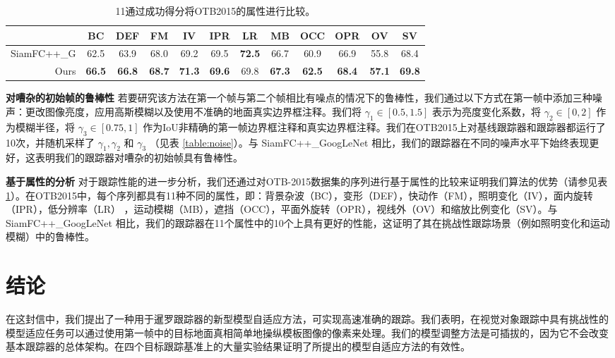 \begin{table}[t]
\renewcommand\arraystretch{0.8}
\centering
\setlength{\tabcolsep}{2pt}
\caption{11通过成功得分将OTB2015的属性进行比较。}
\begin{tabular}{r c c c c c c c c c c c}
\toprule
            & BC & DEF & FM            & IV            & IPR           & LR    & MB    & OCC   & OPR   & OV    & SV    \\
\midrule
SiamFC++\_G  &  62.5 & 63.9 & 68.0          & 69.2          & 69.5          & \textbf{72.5}  & 66.7 & 60.9 & 66.9 & 55.8 & 68.4 \\
Ours        & \textbf{66.5} & \textbf{66.8} & \textbf{68.7} & \textbf{71.3} & \textbf{69.6} & 69.8  & \textbf{67.3} & \textbf{62.5} & \textbf{68.4} & \textbf{57.1} & \textbf{69.8} \\
\bottomrule
\end{tabular}
\label{table:attr}
\end{table}

\textbf{对嘈杂的初始帧的鲁棒性} 若要研究该方法在第一个帧与第二个帧相比有噪点的情况下的鲁棒性，我们通过以下方式在第一帧中添加三种噪声：更改图像亮度，应用高斯模糊以及使用不准确的地面真实边界框注释。我们将 $\gamma_1 \in [0.5, 1.5]$ 表示为亮度变化系数，将 $\gamma_2 \in [0, 2]$ 作为模糊半径，将 $\gamma_3 \in [0.75, 1]$ 作为IoU非精确的第一帧边界框注释和真实边界框注释。我们在OTB2015上对基线跟踪器和跟踪器都运行了10次，并随机采样了 $\gamma_1, \gamma_2$ 和 $\gamma_3$ （见表 \ref{table:noise}）。与 SiamFC++\_GoogLeNet \cite{SiamFC++} 相比，我们的跟踪器在不同的噪声水平下始终表现更好，这表明我们的跟踪器对嘈杂的初始帧具有鲁棒性。%

\textbf{基于属性的分析} 对于跟踪性能的进一步分析，我们还通过对OTB-2015数据集的序列进行基于属性的比较来证明我们算法的优势（请参见表 \ref{table:attr}）。在OTB2015中，每个序列都具有11种不同的属性，即：背景杂波（BC），变形（DEF），快动作（FM），照明变化（IV），面内旋转（IPR），低分辨率（LR） ，运动模糊（MB），遮挡（OCC），平面外旋转（OPR），视线外（OV）和缩放比例变化（SV）。与 SiamFC++\_GoogLeNet \cite{SiamFC++} 相比，我们的跟踪器在11个属性中的10个上具有更好的性能，这证明了其在挑战性跟踪场景（例如照明变化和运动模糊）中的鲁棒性。

\section{结论}
在这封信中，我们提出了一种用于暹罗跟踪器的新型模型自适应方法，可实现高速准确的跟踪。我们表明，在视觉对象跟踪中具有挑战性的模型适应任务可以通过使用第一帧中的目标地面真相简单地操纵模板图像的像素来处理。我们的模型调整方法是可插拔的，因为它不会改变基本跟踪器的总体架构。在四个目标跟踪基准上的大量实验结果证明了所提出的模型自适应方法的有效性。
